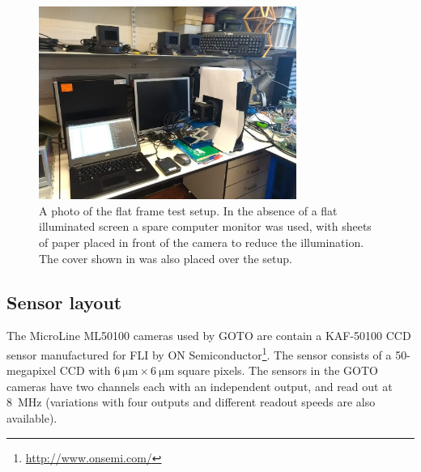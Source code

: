 \begin{colsection}
\begin{colsection}
\begin{figure}[p]
    \begin{center}
        \includegraphics[width=0.75\textwidth]{images/flat_photo.jpg}
    \end{center}
    \caption[The flat frame test setup]{
        A photo of the flat frame test setup. In the absence of a flat illuminated screen a spare computer monitor was used, with sheets of paper placed in front of the camera to reduce the illumination. The cover shown in  was also placed over the setup.
    }\label{fig:flat_photo}
\end{figure}

\clearpage

\end{colsection}

\subsection{Sensor layout}
\label{sec:chip_layout}
\begin{colsection}

The MicroLine ML50100 cameras used by GOTO are contain a KAF-50100 CCD sensor manufactured for FLI by ON Semiconductor\footnote{\url{http://www.onsemi.com/}}. The sensor consists of a 50-megapixel CCD with $\SI{6}{\micro\metre} \times \SI{6}{\micro\metre}$ square pixels. The sensors in the GOTO cameras have two channels each with an independent output, and read out at \SI{8}{\mega\hertz} (variations with four outputs and different readout speeds are also available).


\end{colsection}
\end{colsection}
